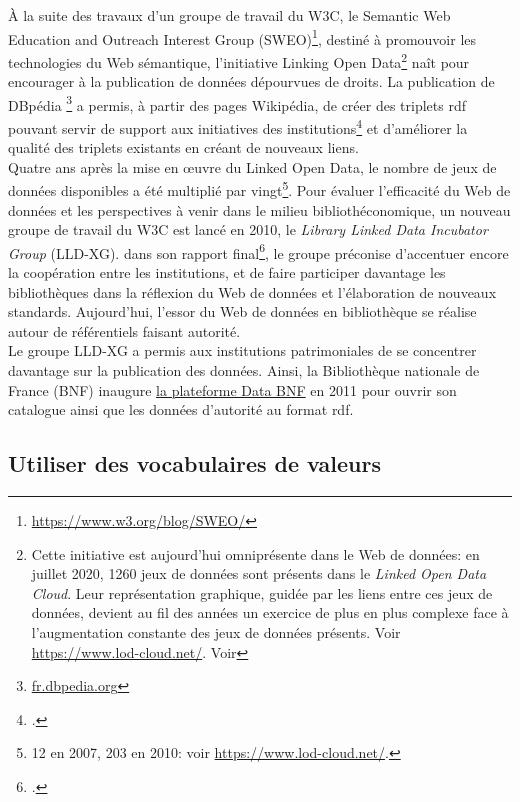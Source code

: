 À la suite des travaux d'un groupe de travail du W3C, le Semantic Web Education and Outreach Interest Group (SWEO)\footnote{\url{https://www.w3.org/blog/SWEO/}}, destiné à promouvoir les technologies du Web sémantique, l'initiative \og Linking Open Data\fg{}\footnote{Cette initiative est aujourd'hui omniprésente dans le Web de données: en juillet 2020, 1260 jeux de données sont présents dans le \textit{Linked Open Data Cloud}. Leur représentation graphique, guidée par les liens entre ces jeux de données, devient au fil des années un exercice de plus en plus complexe face à l'augmentation constante des jeux de données présents. Voir \url{https://www.lod-cloud.net/}. Voir } naît pour encourager à la publication de données dépourvues de droits. La publication de DBpédia \footnote{\url{fr.dbpedia.org}} a permis, à partir des pages Wikipédia, de créer des triplets \ac{rdf} pouvant servir de support aux initiatives des institutions\footcite{bermes_convergence_2013} et d'améliorer la qualité des triplets existants en créant de nouveaux liens.\\

Quatre ans après la mise en œuvre du Linked Open Data, le nombre de jeux de données disponibles a été multiplié par vingt\footnote{12 en 2007, 203 en 2010: voir \url{https://www.lod-cloud.net/}.}. Pour évaluer l'efficacité du Web de données et les perspectives à venir dans le milieu bibliothéconomique, un nouveau groupe de travail du W3C est lancé en 2010, le \textit{Library Linked Data Incubator Group} (LLD-XG). dans son rapport final\footcite{baker_rapport_2012}, le groupe préconise d'accentuer encore la coopération entre les institutions, et de faire participer davantage les bibliothèques dans la réflexion du Web de données et l'élaboration de nouveaux standards. Aujourd'hui, l'essor du Web de données en bibliothèque se réalise autour de référentiels faisant autorité.\\

Le groupe LLD-XG a permis aux institutions patrimoniales de se concentrer davantage sur la publication des données. Ainsi, la Bibliothèque nationale de France (BNF) inaugure \href{data.bnf.fr}{la plateforme Data BNF} en 2011 pour ouvrir son catalogue ainsi que les données d'autorité au format \ac{rdf}.

\subsection{\label{II-A-2-b}Utiliser des vocabulaires de valeurs}

